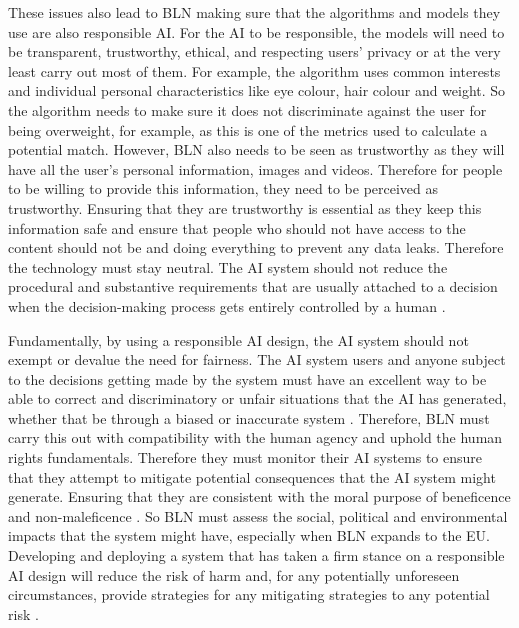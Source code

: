 \documentclass[a4paper,10pt]{article}
\begin{document}

	These issues also lead to BLN making sure that the algorithms and models they use are also responsible AI. For the AI to be responsible, the models will need to be transparent, trustworthy, ethical, and respecting users' privacy \cite{berte_slides_ai_law_overview} or at the very least carry out most of them. For example, the algorithm uses common interests and individual personal characteristics like eye colour, hair colour and weight. So the algorithm needs to make sure it does not discriminate against the user for being overweight, for example, as this is one of the metrics used to calculate a potential match. However, BLN also needs to be seen as trustworthy as they will have all the user's personal information, images and videos. Therefore for people to be willing to provide this information, they need to be perceived as trustworthy. Ensuring that they are trustworthy is essential as they keep this information safe and ensure that people who should not have access to the content should not be and doing everything to prevent any data leaks. Therefore the technology must stay neutral. The AI system should not reduce the procedural and substantive requirements that are usually attached to a decision when the decision-making process gets entirely controlled by a human \cite{adam_slides_regulating_ai}.

	Fundamentally, by using a responsible AI design, the AI system should not exempt or devalue the need for fairness. The AI system users and anyone subject to the decisions getting made by the system must have an excellent way to be able to correct and discriminatory or unfair situations that the AI has generated, whether that be through a biased or inaccurate system \cite{adam_slides_regulating_ai}. Therefore, BLN must carry this out with compatibility with the human agency and uphold the human rights fundamentals. Therefore they must monitor their AI systems to ensure that they attempt to mitigate potential consequences that the AI system might generate. Ensuring that they are consistent with the moral purpose of beneficence and non-maleficence \cite{adam_slides_regulating_ai}. So BLN must assess the social, political and environmental impacts that the system might have, especially when BLN expands to the EU. Developing and deploying a system that has taken a firm stance on a responsible AI design will reduce the risk of harm and, for any potentially unforeseen circumstances, provide strategies for any mitigating strategies to any potential risk \cite{adam_slides_regulating_ai}.
\end{document}
